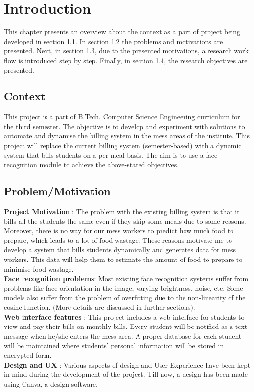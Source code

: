 \chapter{Introduction}
\label{introchap}

This chapter presents an overview about the context as a part of project being developed in section 1.1. In section 1.2 the problems and
motivations are presented. Next, in section 1.3, due to the presented motivations, a
research work flow is introduced step by step. Finally, in section 1.4, the research
objectives are presented.

\section{Context}
This project is a part of B.Tech. Computer Science Engineering curriculum for the third semester. The objective is to develop and experiment with solutions to automate and dynamise the billing system in the mess areas of the institute. This project will replace the current billing system (semester-based) with a dynamic system that bills students on a per meal basis. The aim is to use a face recognition module to achieve the above-stated objectives.


\section{Problem/Motivation}
\textbf{Project Motivation} : The problem with the existing billing system is that it bills all the students the same even if they skip some meals due to some reasons. Moreover, there is no way for our mess workers to predict how much food to prepare, which leads to a lot of food wastage. These reasons motivate me to develop a system that bills students dynamically and generates data for mess workers. This data will help them to estimate the amount of food to prepare to minimise food wastage.\\
\textbf{Face recognition problems}: Most existing face recognition systems suffer from problems like face orientation in the image, varying brightness, noise, etc. Some models also suffer from the problem of overfitting due to the non-linearity of the cosine function. (More details are discussed in further sections).\\
\textbf{Web interface features} : This project includes a web interface for students to view and pay their bills on monthly bills. Every student will be notified as a text message when he/she enters the mess area. A proper database for each student will be maintained where students' personal information will be stored in encrypted form.\\
\textbf{Design and UX} : Various aspects of design and User Experience have been kept in mind during the development of the project. Till now, a design has been made using Canva, a design software.

